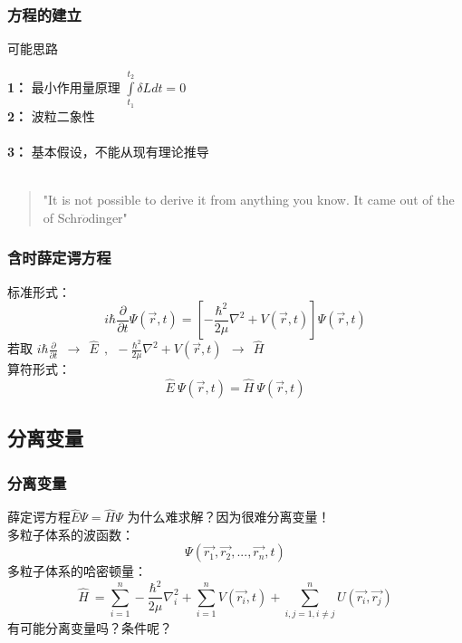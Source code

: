 \begin{frame}
	\frametitle{方程的建立}
	\begin{alertblock} {可能思路}  
		\begin{itemize}
			\Item 	\textbf{1：}  最小作用量原理 $\int\limits_{t_1}^{t_2} \delta L d t =0 $\\ 
			\Item 	\textbf{2：}  波粒二象性\\ 
			~\\ 
			\Item 	\textbf{3：}  基本假设，不能从现有理论推导\\
            ~\\ 
            \begin{quote}
            "It is not possible to derive it from anything you know. It came out of the \alert{\faHeartbeat} of Schr$\ddot{o}$dinger"\\
            \end{quote}
		\end{itemize}
	\end{alertblock}
\end{frame}
\begin{frame}
	\frametitle{含时薛定谔方程}
	标准形式：   \\ 
	 \begin{equation*}
		i\hbar \frac{\partial }{\partial t} \Psi (\overrightarrow{r},t ) =\left [ -\frac{\hbar^2}{2\mu }\nabla ^2 + V(\overrightarrow{r},t ) \right ]\Psi (\overrightarrow{r}, t ) 
	\end{equation*}
	若取 $ \displaystyle  i\hbar \frac{\partial }{\partial t} ~~\to ~~ \hat{E} ~~, ~~  -\frac{\hbar^2}{2\mu }\nabla ^2 + V(\vec{r},t ) ~~\to ~~ \hat{H} $ \\
	算符形式：   \\ 
	\begin{equation*}
		\hat{E} ~ \Psi (\overrightarrow{r},t )  = \hat{H} ~ \Psi (\overrightarrow{r},t )  
	\end{equation*}
\end{frame}

\subsection{分离变量}

\begin{frame}
	\frametitle{分离变量}
	\begin{alertblock} {薛定谔方程$\hat{E} \Psi = \hat{H}  \Psi $ 为什么难求解？因为很难分离变量！}
		~~\\
		多粒子体系的波函数：
		\begin{equation*}
			\Psi (\vec{r_1},\vec{r_2},...,\vec{r_n},t )
		\end{equation*}		
		多粒子体系的哈密顿量：
		\begin{equation*}
			\hat{H} ~=\sum_{i=1}^{n} -\frac{\hbar^2}{2\mu }\nabla ^2 _i + \sum_{i=1}^{n} V(\vec{r_i},t) + \sum_{i,j=1, i\ne j}^{n}  U(\vec{r_i},\vec{r_j}) 
		\end{equation*}	
		有可能分离变量吗？条件呢？
	\end{alertblock}	
\end{frame}

